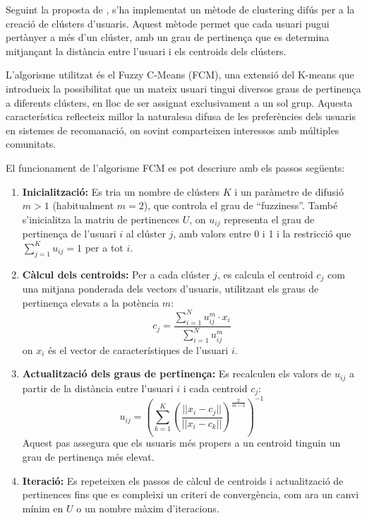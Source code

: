 \documentclass[a4paper,12pt]{report}
\begin{document}
Seguint la proposta de \cite{koohi2016user}, s’ha implementat un mètode de clustering difús per a la creació de clústers d’usuaris. Aquest mètode permet que cada usuari pugui pertànyer a més d’un clúster, amb un grau de pertinença que es determina mitjançant la distància entre l’usuari i els centroids dels clústers.

L’algorisme utilitzat és el Fuzzy C-Means (FCM), una extensió del K-means que introdueix la possibilitat que un mateix usuari tingui diversos graus de pertinença a diferents clústers, en lloc de ser assignat exclusivament a un sol grup. Aquesta característica reflecteix millor la naturalesa difusa de les preferències dels usuaris en sistemes de recomanació, on sovint comparteixen interessos amb múltiples comunitats.

El funcionament de l’algorisme FCM es pot descriure amb els passos següents:

\begin{enumerate}
    \item \textbf{Inicialització:} Es tria un nombre de clústers \( K \) i un paràmetre de difusió \( m > 1 \) (habitualment \( m = 2 \)), que controla el grau de “fuzziness”. També s’inicialitza la matriu de pertinences \( U \), on \( u_{ij} \) representa el grau de pertinença de l’usuari \( i \) al clúster \( j \), amb valors entre 0 i 1 i la restricció que \( \sum_{j=1}^{K} u_{ij} = 1 \) per a tot \( i \).
    
    \item \textbf{Càlcul dels centroids:} Per a cada clúster \( j \), es calcula el centroid \( c_j \) com una mitjana ponderada dels vectors d’usuaris, utilitzant els graus de pertinença elevats a la potència \( m \):
    \[
    c_j = \frac{\sum_{i=1}^{N} u_{ij}^m \cdot x_i}{\sum_{i=1}^{N} u_{ij}^m}
    \]
    on \( x_i \) és el vector de característiques de l’usuari \( i \).

    \item \textbf{Actualització dels graus de pertinença:} Es recalculen els valors de \( u_{ij} \) a partir de la distància entre l’usuari \( i \) i cada centroid \( c_j \):
    \[
    u_{ij} = \left( \sum_{k=1}^{K} \left( \frac{||x_i - c_j||}{||x_i - c_k||} \right)^{\frac{2}{m-1}} \right)^{-1}
    \]
    Aquest pas assegura que els usuaris més propers a un centroid tinguin un grau de pertinença més elevat.

    \item \textbf{Iteració:} Es repeteixen els passos de càlcul de centroids i actualització de pertinences fins que es compleixi un criteri de convergència, com ara un canvi mínim en \( U \) o un nombre màxim d’iteracions.
\end{enumerate}
\end{document}
